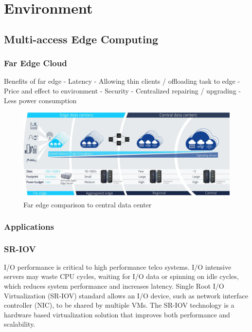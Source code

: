 \chapter{Environment}
\label{chapter:environment}

\section{Multi-access Edge Computing}

\subsection{Far Edge Cloud}

Benefits of far edge
    - Latency
    - Allowing thin clients / offloading task to edge
    - Price and effect to environment
    - Security
    - Centralized repairing / upgrading
    - Less power consumption
    

\begin{figure}[ht]
  \begin{center}
    \includegraphics[width=13.5cm]{LaTeX/images/AirFrameOpenEdgeServer.png}
    \caption{Far edge comparison to central data center \cite{AirFrameOpenEdgeServer}}
    \label{fig:AirFrameOpenEdgeServer}
  \end{center}
\end{figure}

\subsection{Applications}


\subsection{SR-IOV}
\label{section:SR-IOV}

I/O performance is critical to high performance telco systems. I/O intensive servers may waste CPU cycles, waiting for I/O data or spinning on idle cycles, which reduces system performance and increases latency. Single Root I/O Virtualization (SR-IOV) standard allows an I/O device, such as network interface controller (NIC), to be shared by multiple VMs. The SR-IOV technology is a hardware based virtualization solution that improves both performance and scalability. \cite{Dong2012}

